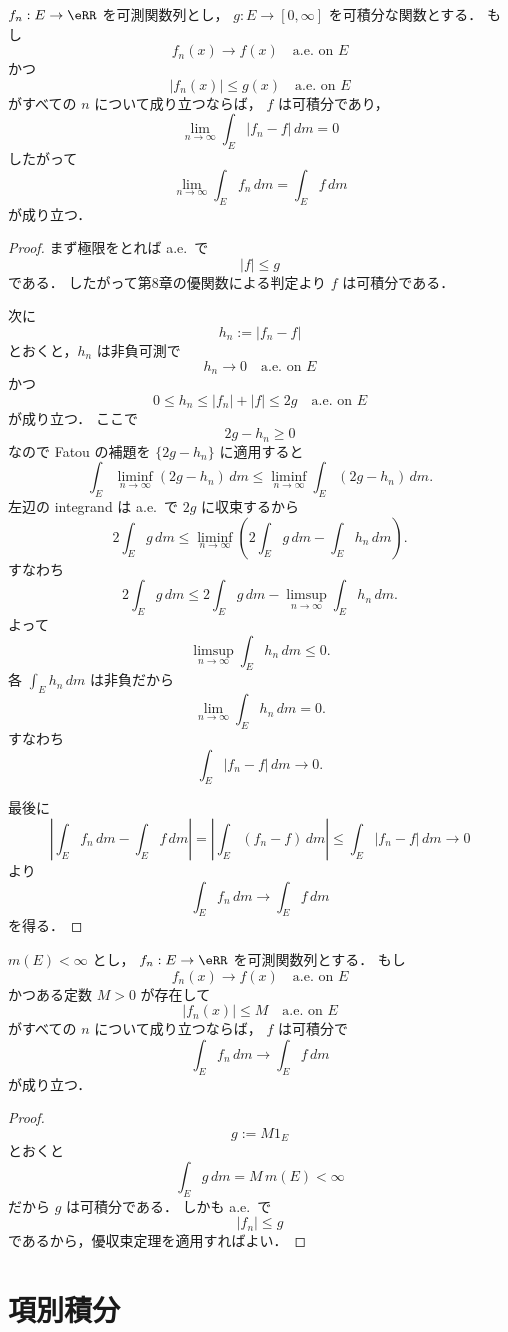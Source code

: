 \begin{theorem}[優収束定理]
$f_n:E \to \eRR$ を可測関数列とし，
$g:E \to [0,\infty]$ を可積分な関数とする．
もし
\[
f_n(x)\to f(x) \quad \text{a.e.\ on } E
\]
かつ
\[
|f_n(x)|\le g(x) \quad \text{a.e.\ on } E
\]
がすべての $n$ について成り立つならば，
$f$ は可積分であり，
\[
\lim_{n\to\infty}\int_E |f_n-f|\,dm=0
\]
したがって
\[
\lim_{n\to\infty}\int_E f_n\,dm=\int_E f\,dm
\]
が成り立つ．
\end{theorem}
\begin{proof}
まず極限をとれば a.e.\ で
\[
|f|\le g
\]
である．
したがって第8章の優関数による判定より $f$ は可積分である．

次に
\[
h_n:=|f_n-f|
\]
とおくと，$h_n$ は非負可測で
\[
h_n\to 0 \quad \text{a.e.\ on } E
\]
かつ
\[
0\le h_n\le |f_n|+|f|\le 2g \quad \text{a.e.\ on } E
\]
が成り立つ．
ここで
\[
2g-h_n \ge 0
\]
なので Fatou の補題を $\{2g-h_n\}$ に適用すると
\[
\int_E \liminf_{n\to\infty}(2g-h_n)\,dm
\le
\liminf_{n\to\infty}\int_E (2g-h_n)\,dm.
\]
左辺の integrand は a.e.\ で $2g$ に収束するから
\[
2\int_E g\,dm
\le
\liminf_{n\to\infty}\left(2\int_E g\,dm-\int_E h_n\,dm\right).
\]
すなわち
\[
2\int_E g\,dm
\le
2\int_E g\,dm-\limsup_{n\to\infty}\int_E h_n\,dm.
\]
よって
\[
\limsup_{n\to\infty}\int_E h_n\,dm\le 0.
\]
各 $\int_E h_n\,dm$ は非負だから
\[
\lim_{n\to\infty}\int_E h_n\,dm=0.
\]
すなわち
\[
\int_E |f_n-f|\,dm \to 0.
\]

最後に
\[
\left|\int_E f_n\,dm-\int_E f\,dm\right|
=
\left|\int_E (f_n-f)\,dm\right|
\le
\int_E |f_n-f|\,dm
\to 0
\]
より
\[
\int_E f_n\,dm\to \int_E f\,dm
\]
を得る．
\end{proof}

\begin{corollary}[有界収束定理]
$m(E)<\infty$ とし，
$f_n:E \to \eRR$ を可測関数列とする．
もし
\[
f_n(x)\to f(x)\quad \text{a.e.\ on } E
\]
かつある定数 $M>0$ が存在して
\[
|f_n(x)|\le M \quad \text{a.e.\ on } E
\]
がすべての $n$ について成り立つならば，
$f$ は可積分で
\[
\int_E f_n\,dm\to \int_E f\,dm
\]
が成り立つ．
\end{corollary}
\begin{proof}
\[
g:=M1_E
\]
とおくと
\[
\int_E g\,dm=M\,m(E)<\infty
\]
だから $g$ は可積分である．
しかも a.e.\ で
\[
|f_n|\le g
\]
であるから，優収束定理を適用すればよい．
\end{proof}

\section{項別積分}

